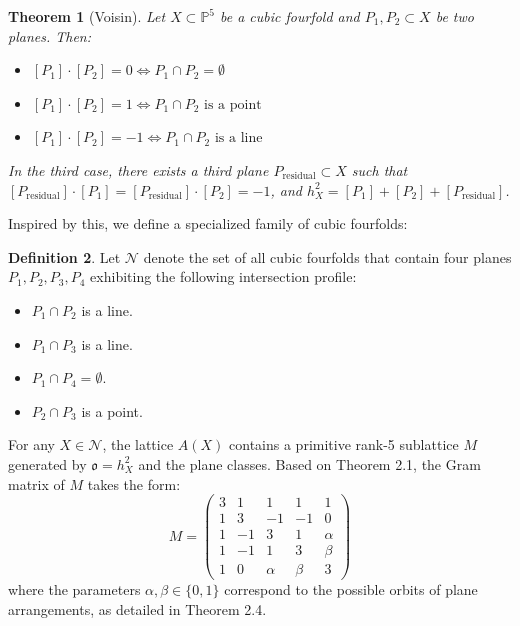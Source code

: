 \documentclass[11pt,letterpaper]{amsart} %
\newtheorem{theorem}{Theorem}[section]
\theoremstyle{definition}
\newtheorem{definition}[theorem]{Definition}
\begin{document}
\begin{theorem}[Voisin]
Let $X \subset \mathbb{P}^5$ be a cubic fourfold and $P_1, P_2 \subset X$ be two planes. Then:
\begin{itemize}
    \item $[P_1] \cdot [P_2] = 0 \iff P_1 \cap P_2 = \emptyset$ %
    \item $[P_1] \cdot [P_2] = 1 \iff P_1 \cap P_2 \text{ is a point}$ %
    \item $[P_1] \cdot [P_2] = -1 \iff P_1 \cap P_2 \text{ is a line}$ %
\end{itemize}
In the third case, there exists a third plane $P_{\text{residual}} \subset X$ such that $[P_{\text{residual}}] \cdot [P_1] = [P_{\text{residual}}] \cdot [P_2] = -1$, and $h_X^2 = [P_1] + [P_2] + [P_{\text{residual}}]$. %
\end{theorem}

Inspired by this, we define a specialized family of cubic fourfolds: 

\begin{definition}
Let $\mathcal{N}$ denote the set of all cubic fourfolds that contain four planes $P_1, P_2, P_3, P_4$ exhibiting the following intersection profile: %
\begin{itemize}
    \item $P_1 \cap P_2$ is a line. 
    \item $P_1 \cap P_3$ is a line. 
    \item $P_1 \cap P_4 = \emptyset$. 
    \item $P_2 \cap P_3$ is a point. 
\end{itemize}
For any $X \in \mathcal{N}$, the lattice $A(X)$ contains a primitive rank-5 sublattice $M$ generated by $\mathfrak{o} = h_X^2$ and the plane classes. %
Based on Theorem 2.1, the Gram matrix of $M$ takes the form: %
\begin{equation}\label{eqn:matrix for M}
M = \begin{pmatrix} 
3 & 1 & 1 & 1 & 1 \\ 
1 & 3 & -1 & -1 & 0 \\ 
1 & -1 & 3 & 1 & \alpha \\ 
1 & -1 & 1 & 3 & \beta \\ 
1 & 0 & \alpha & \beta & 3 
\end{pmatrix}
\end{equation}
where the parameters $\alpha, \beta \in \{0,1\}$ correspond to the possible orbits of plane arrangements, as detailed in Theorem 2.4.
\end{definition}
\end{document}
